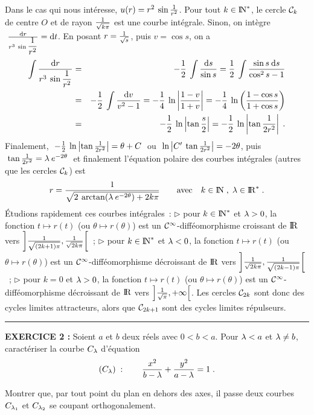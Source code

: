 \documentclass{article}
\begin{document}
\msk
Dans le cas qui nous int\'eresse, $u(r)=r^2\>\sin{1\over r^2}$. Pour tout $k\in{\rm I\kern-0.5mm N}^*$, le cercle ${\cal C}_k$ de centre $O$ et de rayon ${1\over\sqrt{k\pi}}$ est une courbe int\'egrale. Sinon, on int\`egre $\;{{\rm d}r\over r^3\>\sin\displaystyle{1\over r^2}}={\rm d}t$. En posant $r={1\over\sqrt{s}}$, puis $v=\cos s$, on a\vv
\begin{eqnarray*}
\int{{\rm d}r\over r^3\>\sin\displaystyle{1\over r^2}} & = & -{1\over2}\>\int{{\rm d}s\over\sin s}={1\over2}\>\int{\sin s\>{\rm d}s\over\cos^2s-1}\\
& = & -{1\over2}\>\int{{\rm d}v\over v^2-1}=-{1\over4}\>\ln\left|{1-v\over 1+v}\right| =-{1\over4}\>\ln\left({1-\cos s\over 1+\cos s}\right)\\
& = & -{1\over2}\>\ln\left|\tan{s\over2}\right|=-{1\over2}\>\ln\left|\tan{1\over2r^2}\right|\;.
\end{eqnarray*}
Finalement, $\;-{1\over2}\>\ln\left|\tan{1\over2r^2}\right|=\theta+C\;$ ou $\;\ln\left|C'\>\tan{1\over2r^2}\right|=-2\theta$, puis $\;\tan{1\over2r^2}=\lambda\>e^{-2\theta}\;$ et finalement l'\'equation polaire des courbes int\'egrales (autres que les cercles ${\cal C}_k$) est\vv
$$r={1\over\sqrt{2\>\arctan(\lambda\>e^{-2\theta})+2k\pi}}\qquad{\rm avec}\quad k\in{\rm I\kern-0.5mm N}\;,\;\lambda\in{\rm I\kern-0.6mm R}^*\;.$$
\msk
\'Etudions rapidement ces courbes int\'egrales~:\ssk\sect
$\triangleright$ pour $k\in{\rm I\kern-0.5mm N}^*$ et $\lambda>0$, la fonction $t\mapsto r(t)$ (ou $\theta\mapsto r(\theta)$) est un ${\cal C}^{\infty}$-diff\'eomorphisme croissant de ${\rm I\kern-0.6mm R}$ vers $\left]{1\over\sqrt{(2k+1)\pi}},{1\over\sqrt{2k\pi}}\right[$~;\ssk\sect
$\triangleright$ pour $k\in{\rm I\kern-0.5mm N}^*$ et $\lambda<0$, la fonction $t\mapsto r(t)$ (ou $\theta\mapsto r(\theta)$) est un ${\cal C}^{\infty}$-diff\'eomorphisme d\'ecroissant de ${\rm I\kern-0.6mm R}$ vers $\left]{1\over\sqrt{2k\pi}},{1\over\sqrt{(2k-1)\pi}}\right[$~;\ssk\sect
$\triangleright$ pour $k=0$ et $\lambda>0$, la fonction $t\mapsto r(t)$ (ou $\theta\mapsto r(\theta)$) est un ${\cal C}^{\infty}$-diff\'eomorphisme d\'ecroissant de ${\rm I\kern-0.6mm R}$ vers $\left]{1\over\sqrt{\pi}},+\infty\right[$.
\msk
Les cercles ${\cal C}_{2k}$ sont donc des cycles limites attracteurs, alors que ${\cal C}_{2k+1}$ sont des cycles limites r\'epulseurs.

\bsk
\hrule
\bsk

{\bf EXERCICE 2 :}\msk
Soient $a$ et $b$ deux r\'eels avec $0<b<a$.\msk
Pour $\lambda<a$ et $\lambda\not=b$, caract\'eriser la courbe $C_{\lambda}$ d'\'equation\vv
$$(C_{\lambda})\;:\qquad {x^2\over b-\lambda}+{y^2\over a-\lambda}=1\;.$$\par
Montrer que, par tout point du plan en dehors des axes, il passe deux courbes $C_{\lambda_1}$ et $C_{\lambda_2}$ se coupant orthogonalement.


\msk
\cl{- - - - - - - - - - - - - - - - - - - - - - - - - - - - - - - }
\msk
\end{document}
